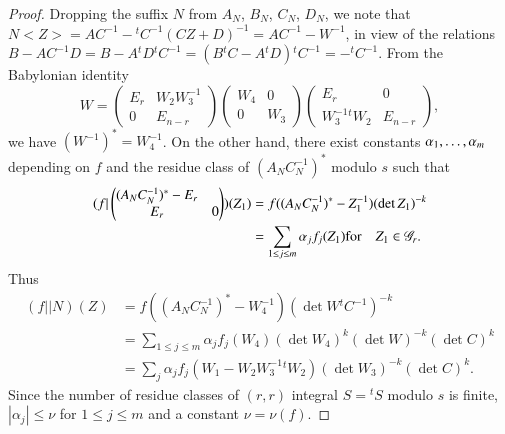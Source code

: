 \begin{proof}
Dropping the suffix $N$ from $A_{N}$, $B_{N}$, $C_{N}$, $D_{N}$, we
note that $N<Z>=AC^{-1}-{}^{t}C^{-1}(CZ+D)^{-1}=AC^{-1}-W^{-1}$, in
view of the relations
$B-AC^{-1}D=B-A{}^{t}D{}^{t}C^{-1}=(B{}^{t}C-A{}^{t}D){}^{t}C^{-1}=-{}^{t}C^{-1}$.
From\pageoriginale
the Babylonian identity 
$$
W=
\begin{pmatrix}
E_{r} & W_{2}W^{-1}_{3}\\
0 & E_{n-r}
\end{pmatrix}
\begin{pmatrix}
W_{4} & 0\\
0 & W_{3}
\end{pmatrix}
\begin{pmatrix}
E_{r} & 0\\
W^{-1}_{3}{}^{t}W_{2} & E_{n-r}
\end{pmatrix},
$$
we have $(W^{-1})^{\ast}=W^{-1}_{4}$. On the other hand, there exist
constants $\alpha_{1},\ldots,\break\alpha_{m}$ depending on $f$ and the
residue class of $(A_{N}C^{-1}_{N})^{\ast}$ modulo $s$ such that
\begin{align*}
(f|
\begin{pmatrix}
(A_{N}C^{-1}_{N})^{\ast} -E_{r}\\
E_{r} & 0
\end{pmatrix}
)(Z_{1})&=f((A_{N}C^{-1}_{N})^{\ast}-Z^{-1}_{1})(\det
Z_{1})^{-k}\\
&=\sum_{1\leq j\leq m}\alpha_{j}f_{j}(Z_{1})
\text{for\quad} Z_{1}\in\mathscr{G}_{r}.
\end{align*}
Thus
\begin{align*}
(f||N)(Z) &= f((A_{N}C^{-1}_{N})^{\ast}-W^{-1}_{4})(\det
  W{}^{t}C^{-1})^{-k}\\
&=\sum_{1\leq j\leq m}\alpha_{j}f_{j}(W_{4})(\det W_{4})^{k}(\det
  W)^{-k}(\det C)^{k}\\
&= \sum_{j}\alpha_{j}f_{j}(W_{1}-W_{2}W^{-1}_{3}{}^{t}W_{2})(\det
  W_{3})^{-k}(\det C)^{k}. 
\end{align*}
Since the number of residue classes of $(r,r)$ integral $S={}^{t}S$
modulo $s$ is finite, $|\alpha_{j}|\leq \nu$ for $1\leq j\leq m$ and a
constant $\nu=\nu(f)$.
\end{proof}

